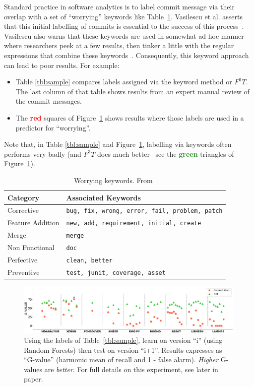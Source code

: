 \documentclass[10pt,conference]{IEEEtran}
\newcommand{\bi}{\begin{itemize}[leftmargin=0.4cm]}
\newcommand{\ei}{\end{itemize}}
\newcommand{\fig}[1]{Figure~\ref{fig:#1}}
\newcommand{\tbl}[1]{Table~\ref{tbl:#1}}
\begin{document}
Standard 
  practice in software analytics is to
  label   commit message via their
  overlap  with a set of ``worrying'' keywords like  Table~\ref{tab:words}.
  Vasilescu et al. \cite{Vasilescu15github} asserts that this initial labelling of  commits is essential
  to the success of this process~\cite{commitguru, Kim08changes, catolino17_jitmobile, nayrolles18_clever}.  Vasilescu also warns that these
  keywords are used in somewhat ad hoc manner where researchers peek at a few results, then tinker a little with the regular expressions that combine these keywords~\cite{Vasilescu18z}. 
  Consequently,   this keyword approach can lead to poor results.
 For example:
 \bi
 \item Table \ref{tbl:sample} compares   labels assigned
    via  the keyword method or $F^3T$.
    The last column of that table shows   results from an expert manual review of 
    the commit messages. 
    \item
   The \textcolor{red}{\bf red} squares of \fig{rq3_1} shows results where those labels are used in a predictor
    for ``worrying''.
    \ei
    Note that, in Table \ref{tbl:sample} and \fig{rq3_1}, labelling
    via keywords
    often performs very badly   
    (and $F^3T$ does much better-- see the \textcolor{ForestGreen}{\bf green} triangles of \fig{rq3_1}). 
    
  
  

   

\begin{table}[!b]

 {\scriptsize 
 \caption{  Worrying keywords. From~\cite{hindle08_largecommits}}\label{tab:words}
 \begin{tabular}{l|l}
\textbf{Category}  & \textbf{Associated Keywords}    \\\hline
Corrective & \texttt{bug, fix, wrong, error, fail, problem, patch} \\
Feature Addition & \texttt{new, add, requirement, initial, create} \\
Merge & \texttt{merge} \\
Non Functional & \texttt{doc} \\
Perfective & \texttt{clean, better} \\  
Preventive & \texttt{test, junit, coverage, asset} 
\end{tabular}}
\end{table}


\begin{figure}
\caption{Using the labels of \tbl{sample},
learn on version ``i'' (using Random Forests) then  test  on version ``i+1''. Results expresses
as ``G-value'' (harmonic mean of recall and  1 - false alarm). 
{\em Higher} G-values
are {\em better}.  For full details on this experiment, see later in paper.}\label{fig:rq3_1}
\includegraphics[width=\linewidth]{rq3_1.png}
\end{figure}
\end{document}
